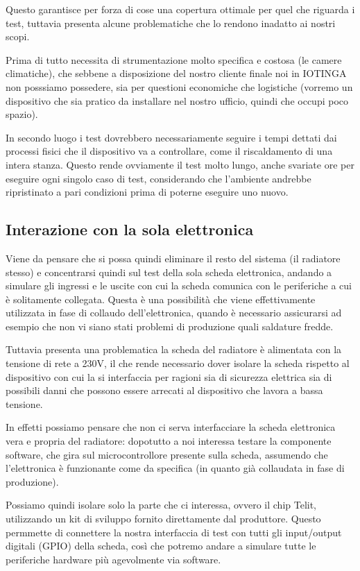\documentclass[12pt,a4paper,twoside,titlepage]{book}
\begin{document}
Questo garantisce per forza di cose una copertura ottimale per quel che riguarda i
test, tuttavia presenta alcune problematiche che lo rendono inadatto ai nostri scopi.

Prima di tutto necessita di strumentazione molto specifica e costosa (le camere climatiche),
che sebbene a disposizione del nostro cliente finale noi in IOTINGA non posssiamo
possedere, sia per questioni economiche che logistiche (vorremo un dispositivo che
sia pratico da installare nel nostro ufficio, quindi che occupi poco spazio).

In secondo luogo i test dovrebbero necessariamente seguire i tempi dettati dai processi
fisici che il dispositivo va a controllare, come il riscaldamento di una intera stanza.
Questo rende ovviamente il test molto lungo, anche svariate ore per eseguire ogni singolo
caso di test, considerando che l'ambiente andrebbe ripristinato a pari condizioni prima
di poterne eseguire uno nuovo.

\subsection{Interazione con la sola elettronica}

Viene da pensare che si possa quindi eliminare il resto del sistema (il radiatore
stesso) e concentrarsi quindi sul test della sola scheda elettronica, andando a
simulare gli ingressi e le uscite con cui la scheda comunica con le periferiche
a cui è solitamente collegata. Questa è una possibilità che viene effettivamente
utilizzata in fase di collaudo dell'elettronica, quando è necessario assicurarsi ad
esempio che non vi siano stati problemi di produzione quali saldature fredde.

Tuttavia presenta una problematica la scheda del radiatore è alimentata con
la tensione di rete a 230V, il che rende necessario dover isolare la scheda rispetto
al dispositivo con cui la si interfaccia per ragioni sia di sicurezza elettrica sia
di possibili danni che possono essere arrecati al dispositivo che lavora a bassa tensione.

In effetti possiamo pensare che non ci serva interfacciare la scheda elettronica
vera e propria del radiatore: dopotutto a noi interessa testare la componente software,
che gira sul microcontrollore presente sulla scheda, assumendo che l'elettronica è
funzionante come da specifica (in quanto già collaudata in fase di produzione).

Possiamo quindi isolare solo la parte che ci interessa, ovvero il chip Telit, utilizzando
un kit di sviluppo fornito direttamente dal produttore. Questo permmette di connettere
la nostra interfaccia di test con tutti gli input/output digitali (GPIO) della scheda,
così che potremo andare a simulare tutte le periferiche hardware più agevolmente via software.
\end{document}
